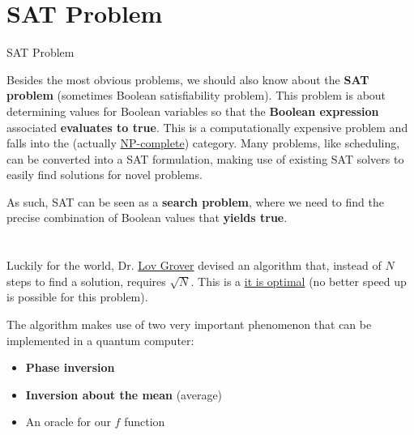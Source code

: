 \documentclass[aspectratio=43]{beamer}
\begin{document}
\section{SAT Problem}
\begin{frame}{SAT Problem}
    \begin{card}
        \small{Besides the most obvious problems, we should also know about the \textbf{SAT problem} (sometimes Boolean satisfiability problem). This problem is about determining values for Boolean variables so that the \textbf{Boolean expression} associated \textbf{evaluates to true}. This is a computationally expensive problem and falls into the \np (actually \href{https://en.wikipedia.org/wiki/NP-completeness}{NP-complete}) category. Many problems, like scheduling, can be converted into a SAT formulation, making use of existing SAT solvers to easily find solutions for novel problems.}
    \end{card}
    \begin{card}
        \small{As such, SAT can be seen as a \textbf{search problem}, where we need to find the precise combination of Boolean values that \textbf{yields true}.}
    \end{card}
\pagenumber
\end{frame}

\section{\gvsa} %
\begin{frame}{\gvsa}
    \begin{card}
        Luckily for the world, Dr. \href{https://en.wikipedia.org/wiki/Lov_Grover}{Lov Grover} devised an algorithm that, instead of $N$ steps to find a solution, requires $\sqrt{N}$. This is a \href{https://arxiv.org/abs/quant-ph/9711070}{it is optimal} (no better speed up is possible for this problem).
    \end{card}
    \begin{card}
        The algorithm makes use of two very important phenomenon that can be implemented in a quantum computer:\begin{itemize}
            \item \textbf{Phase inversion}
            \item \textbf{Inversion about the mean} (average)
            \item An oracle for our $f$ function
        \end{itemize}
    \end{card}
\pagenumber
\end{frame}
\end{document}
